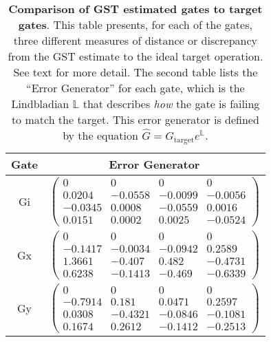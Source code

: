 \documentclass{article}[11pt]
\begin{document}
\begin{table}[h]
\begin{center}
\vspace{2em}
\begin{tabular}[l]{|c|c|}
\hline
Gate & Error Generator \\ \hline
Gi & $ \left(\!\!\begin{array}{cccc}
0 & 0 & 0 & 0 \\ 
0.0204 & -0.0558 & -0.0099 & -0.0056 \\ 
-0.0345 & 0.0008 & -0.0559 & 0.0016 \\ 
0.0151 & 0.0002 & 0.0025 & -0.0524
 \end{array}\!\!\right) $
 \\ \hline
Gx & $ \left(\!\!\begin{array}{cccc}
0 & 0 & 0 & 0 \\ 
-0.1417 & -0.0034 & -0.0942 & 0.2589 \\ 
1.3661 & -0.407 & 0.482 & -0.4731 \\ 
0.6238 & -0.1413 & -0.469 & -0.6339
 \end{array}\!\!\right) $
 \\ \hline
Gy & $ \left(\!\!\begin{array}{cccc}
0 & 0 & 0 & 0 \\ 
-0.7914 & 0.181 & 0.0471 & 0.2597 \\ 
0.0308 & -0.4321 & -0.0846 & -0.1081 \\ 
0.1674 & 0.2612 & -0.1412 & -0.2513
 \end{array}\!\!\right) $
 \\ \hline
\end{tabular}

\caption{\textbf{Comparison of GST estimated gates to target gates}.  This table presents, for each of the gates, three different measures of distance or discrepancy from the GST estimate to the ideal target operation.  See text for more detail.  The second table lists the ``Error Generator'' for each gate, which is the Lindbladian $\mathbb{L}$ that describes \emph{how} the gate is failing to match the target.  This error generator is defined by the equation $\hat{G} = G_{\mathrm{target}}e^{\mathbb{L}}$. \label{bestGatesetVsTargetTable}}
\end{center}
\end{table}
\end{document}
